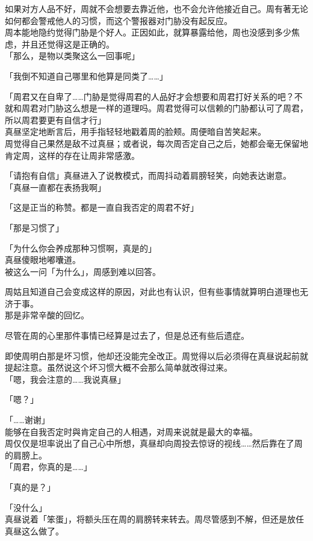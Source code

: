 如果对方人品不好，周就不会想要去靠近他，也不会允许他接近自己。周有著无论如何都会警戒他人的习惯，而这个警报器对门胁没有起反应。\\

周本能地隐约觉得门胁是个好人。正因如此，就算暴露给他，周也没感到多少焦虑，并且还觉得这是正确的。\\

「那么，是物以类聚这么一回事呢」

「我倒不知道自己哪里和他算是同类了……」

「周君又在自卑了……门胁是觉得周君的人品好才会想要和周君打好关系的吧？不就和周君对门胁这么想是一样的道理吗。周君觉得可以信赖的门胁都认可了周君，所以周君要更有自信才行」\\

真昼坚定地断言后，用手指轻轻地戳着周的脸颊。周便暗自苦笑起来。\\

周觉得自己果然是敌不过真昼；或者说，每次周否定自己之后，她都会毫无保留地肯定周，这样的存在让周非常感激。

「请抱有自信」真昼进入了说教模式，而周抖动着肩膀轻笑，向她表达谢意。\\

「真昼一直都在表扬我啊」

「这是正当的称赞。都是一直自我否定的周君不好」

「那是习惯了」

「为什么你会养成那种习惯啊，真是的」\\

真昼傻眼地嘟囔道。\\

被这么一问「为什么」，周感到难以回答。

周姑且知道自己会变成这样的原因，对此也有认识，但有些事情就算明白道理也无济于事。\\

那是非常辛酸的回忆。

尽管在周的心里那件事情已经算是过去了，但是总还有些后遗症。

即使周明白那是坏习惯，他却还没能完全改正。周觉得以后必须得在真昼说起前就提起注意。虽然说这个坏习惯大概不会那么简单就改得过来。\\

「嗯，我会注意的……我说真昼」

「嗯？」

「……谢谢」\\

能够在自我否定时與肯定自己的人相遇，对周来说就是最大的幸福。\\

周仅仅是坦率说出了自己心中所想，真昼却向周投去惊讶的视线……然后靠在了周的肩膀上。\\

「周君，你真的是……」

「真的是？」

「没什么」\\

真昼说着「笨蛋」，将额头压在周的肩膀转来转去。周尽管感到不解，但还是放任真昼这么做了。
